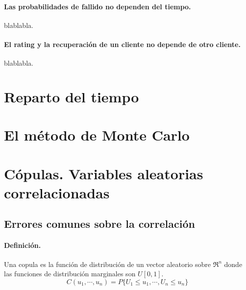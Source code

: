 \paragraph{Las probabilidades de fallido no dependen del tiempo.}
blablabla.

\paragraph{El rating y la recuperaci\'on de un cliente no depende de otro cliente.}
blablabla.



\section{Reparto del tiempo}



\section{El m\'etodo de Monte Carlo}




\section{C\'opulas. Variables aleatorias correlacionadas}

\subsection{Errores comunes sobre la correlaci\'on}

\paragraph{Definici\'on.}
Una copula es la funci\'on de distribuci\'on de un vector aleatorio sobre 
$\Re^n$ donde las funciones de distribuci\'on marginales son $U[0,1]$. 
\begin{displaymath}
C(u_1, \cdots, u_n) = P\{U_1 \leq u_1, \cdots, U_n \leq u_n\}
\end{displaymath}

